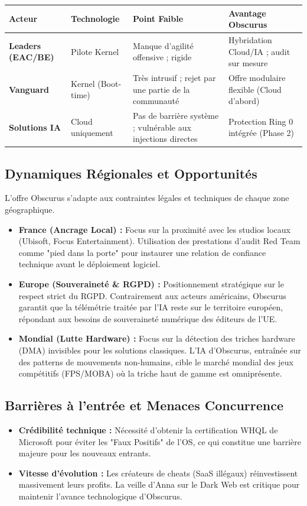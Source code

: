 \documentclass[12pt,a4paper]{article}
\begin{document}
\begin{table}[h!]
\centering
\small
\begin{tabularx}{\textwidth}{@{}lXXX@{}}
\toprule
\textbf{Acteur} & \textbf{Technologie} & \textbf{Point Faible} & \textbf{Avantage Obscurus} \\ \midrule
\textbf{Leaders (EAC/BE)} & Pilote Kernel & Manque d'agilité offensive ; rigide & Hybridation Cloud/IA ; audit sur mesure \\ \midrule
\textbf{Vanguard} & Kernel (Boot-time) & Très intrusif ; rejet par une partie de la communauté & Offre modulaire flexible (Cloud d'abord) \\ \midrule
\textbf{Solutions IA} & Cloud uniquement & Pas de barrière système ; vulnérable aux injections directes & Protection Ring 0 intégrée (Phase 2) \\ \bottomrule
\end{tabularx}
\end{table}

\subsection{Dynamiques Régionales et Opportunités}
L'offre Obscurus s'adapte aux contraintes légales et techniques de chaque zone géographique.

\begin{itemize}
    \item \textbf{France (Ancrage Local) :} Focus sur la proximité avec les studios locaux (Ubisoft, Focus Entertainment). Utilisation des prestations d'audit Red Team comme "pied dans la porte" pour instaurer une relation de confiance technique avant le déploiement logiciel.
    \item \textbf{Europe (Souveraineté \& RGPD) :} Positionnement stratégique sur le respect strict du RGPD. Contrairement aux acteurs américains, Obscurus garantit que la télémétrie traitée par l'IA reste sur le territoire européen, répondant aux besoins de souveraineté numérique des éditeurs de l'UE.
    \item \textbf{Mondial (Lutte Hardware) :} Focus sur la détection des triches hardware (DMA) invisibles pour les solutions classiques. L'IA d'Obscurus, entraînée sur des patterns de mouvements non-humains, cible le marché mondial des jeux compétitifs (FPS/MOBA) où la triche haut de gamme est omniprésente.
\end{itemize}

\subsection{Barrières à l'entrée et Menaces Concurrence}
\begin{itemize}
    \item \textbf{Crédibilité technique :} Nécessité d'obtenir la certification WHQL de Microsoft pour éviter les "Faux Positifs" de l'OS, ce qui constitue une barrière majeure pour les nouveaux entrants.
    \item \textbf{Vitesse d'évolution :} Les créateurs de cheats (SaaS illégaux) réinvestissent massivement leurs profits. La veille d'Anna sur le Dark Web est critique pour maintenir l'avance technologique d'Obscurus.
\end{itemize}
\end{document}
